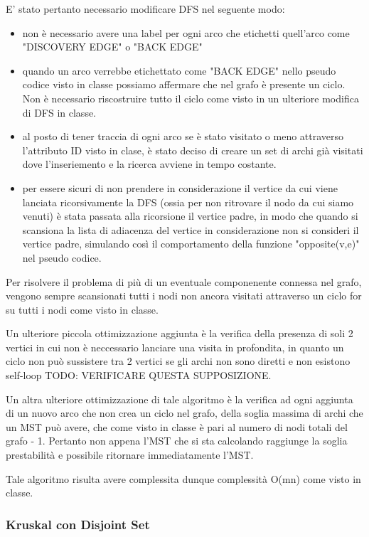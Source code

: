 E' stato pertanto necessario modificare DFS nel seguente modo:
\begin{itemize}
	\item non è necessario avere una label per ogni arco che etichetti quell'arco come "DISCOVERY EDGE" o "BACK EDGE"
	\item quando un arco verrebbe etichettato come "BACK EDGE" nello pseudo codice visto in classe possiamo affermare che nel grafo è presente un ciclo. Non è necessario riscostruire tutto il ciclo come visto in un ulteriore modifica di DFS in classe.
	\item al posto di tener traccia di ogni arco se è stato visitato o meno attraverso l'attributo ID visto in clase, è stato deciso di creare un set di archi già visitati dove l'inseriemento e la ricerca avviene in tempo costante.
	\item per essere sicuri di non prendere in considerazione il vertice da cui viene lanciata ricorsivamente la DFS (ossia per non ritrovare il nodo da cui siamo venuti) è stata passata alla ricorsione il vertice padre, in modo che quando si scansiona la lista di adiacenza del vertice in considerazione non si consideri il vertice padre, simulando così il comportamento della funzione "opposite(v,e)" nel pseudo codice.
\end{itemize}

Per risolvere il problema di più di un eventuale componenente connessa nel grafo, vengono sempre scansionati tutti i nodi non ancora visitati attraverso un ciclo for su tutti i nodi come visto in classe.

Un ulteriore piccola ottimizzazione aggiunta è la verifica della presenza di soli 2 vertici in cui non è neccessario lanciare una visita in profondita, in quanto un ciclo non può sussistere tra 2 vertici se gli archi non sono diretti e non esistono self-loop TODO: VERIFICARE QUESTA SUPPOSIZIONE.

Un altra ulteriore ottimizzazione di tale algoritmo è la verifica ad ogni aggiunta di un nuovo arco che non crea un ciclo nel grafo, della soglia massima di archi che un MST può avere, che come visto in classe è pari al numero di nodi totali del grafo - 1. Pertanto non appena l'MST che si sta calcolando raggiunge la soglia prestabilità e possibile ritornare immediatamente l'MST.

Tale algoritmo risulta avere complessita dunque complessità O(mn) come visto in classe.


\subsubsection{Kruskal con Disjoint Set}
